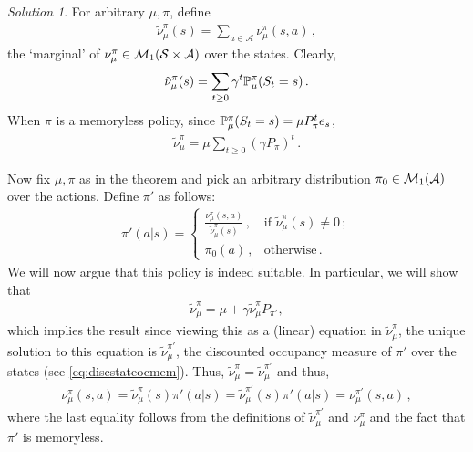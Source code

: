 \documentclass{article}
\DeclareMathOperator*{\1}{\mathbbm{1}}
\theoremstyle{definition}
\theoremstyle{remark}
\newtheorem*{solution*}{Solution}
\newcommand{\cS}{\mathcal{S}}
\newcommand{\cA}{\mathcal{A}}
\begin{document}
\begin{solution*}
For arbitrary $\mu,\pi$,
define
\begin{align*}
\tilde \nu_\mu^\pi(s) = \sum_{a\in \cA} \nu_\mu^\pi(s,a)\,,
\end{align*}
the `marginal' of $\nu_\mu^\pi\in \cM_1(\cS\times \cA)$ over the states.
Clearly, 
\begin{align*}
\tilde \nu_\mu^\pi(s)  = \sum_{t\ge 0} \gamma^t \mathbb{P}_\mu^\pi(S_t=s)\,.
\end{align*}
When $\pi$ is a memoryless policy, since $\mathbb{P}_\mu^\pi(S_t=s) = \mu P_\pi^t e_s$, 
\begin{align} \label{eq:discstateocmem}
\tilde \nu_\mu^\pi =  \mu \sum_{t\ge 0} (\gamma P_\pi)^t\,.
\end{align}

Now fix $\mu,\pi$ as in the theorem 
and pick an arbitrary distribution $\pi_0\in \cM_1(\cA)$ over the actions. 
Define $\pi'$ as follows:
\begin{align*}
\pi'(a|s) = 
\begin{cases}
\frac{\nu_\mu^\pi(s,a)}{{\tilde{\nu}}_\mu^\pi(s)}\,, & \text{if } \tilde \nu_\mu^\pi(s)\ne 0\,;\\
\pi_0(a)\,, & \text{otherwise}\,.
\end{cases}
\end{align*}
We will now argue that this policy is indeed suitable. In particular, we will show that 
\begin{align}
\label{eq:statemargeq}
\tilde \nu_\mu^\pi = \mu + \gamma \tilde \nu_\mu^\pi P_{\pi'},
\end{align}
which implies the result since viewing this as a (linear) 
equation in $\tilde \nu_\mu^\pi$, the unique solution to this equation is $\tilde \nu_\mu^{\pi'}$, the discounted occupancy measure of $\pi'$ over the states (see \cref{eq:discstateocmem}).
Thus, $\tilde \nu_\mu^\pi = \tilde\nu_\mu^{\pi'}$ and thus, 
\begin{align*}
\nu^\pi_\mu(s,a) = \tilde \nu_\mu^\pi(s) \pi'(a|s) = \tilde \nu_\mu^{\pi'}(s) \pi'(a|s) = \nu_\mu^{\pi'}(s,a)\,,
\end{align*}
where the last equality follows from the definitions of $\tilde \nu_\mu^{\pi'}$ and $\nu_\mu^\pi$ and the fact that $\pi'$ is memoryless.


\end{solution*}
\end{document}
